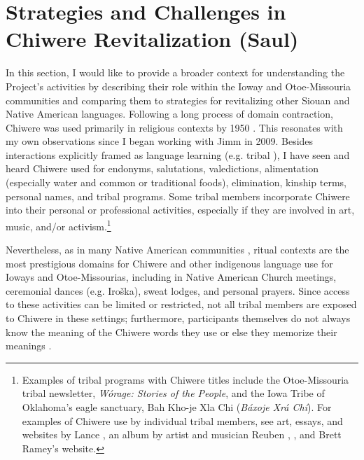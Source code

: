 \documentclass[output=paper]{LSP/langsci}
\begin{document}
\section{Strategies and Challenges in Chiwere Revitalization (Saul)}\label{saul}
In this section, I would like to provide a broader context for understanding the Project's activities by describing their role within the Ioway and Otoe-Missouria communities and comparing them to strategies for revitalizing other Siouan and Native American languages. Following a long process of domain contraction, Chiwere was used primarily in religious contexts by 1950 \citep{Davidson1997, FurbeeStanley1996, FurbeeStanley2002}. This resonates with my own observations since I began working with Jimm in 2009. Besides interactions explicitly framed as language learning (e.g. tribal ), I have seen and heard Chiwere used for endonyms, salutations, valedictions, alimentation (especially water and common or traditional foods), elimination, kinship terms, personal names, and tribal programs. Some tribal members incorporate Chiwere into their personal or professional activities, especially if they are involved in art, music, and/or activism.\footnote{Examples of tribal programs with Chiwere titles include the Otoe-Missouria tribal newsletter, \emph{Wórage: Stories of the People}, and the Iowa Tribe of Oklahoma's eagle sanctuary, Bah Kho-je Xla Chi (\emph{Báxoje Xrá Chí}). For examples of Chiwere use by individual tribal members, see art, essays, and websites by Lance \citet{Foster1989, Foster1996, Foster1999, Foster2009, FosterNDa, FosterNDb, FosterNDc}, an album by artist and musician Reuben \citet{Kent2004}, \citet{Jones2004}, and Brett Ramey's \citeyearpar{RameyND} website.} 

Nevertheless, as in many Native American communities \citep[see e.g.][]{Kroskrity1998}, ritual contexts are the most prestigious domains for Chiwere and other indigenous language use for Ioways and Otoe-Missourias, including in Native American Church meetings, ceremonial dances (e.g. Iroška), sweat lodges, and personal prayers. Since access to these activities can be limited or restricted, not all tribal members are exposed to Chiwere in these settings; furthermore, participants themselves do not always know the meaning of the Chiwere words they use or else they memorize their meanings \citep[see e.g.][520--521]{Davidson1997}.
\end{document}
